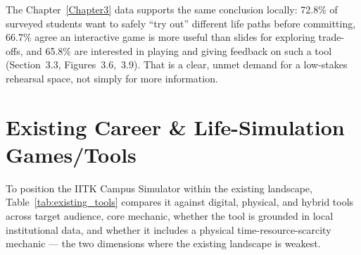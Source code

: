 The Chapter~\ref{Chapter3} data supports the same conclusion locally: 72.8\% of surveyed students want to safely ``try out'' different life paths before committing, 66.7\% agree an interactive game is more useful than slides for exploring trade-offs, and 65.8\% are interested in playing and giving feedback on such a tool (Section~3.3, Figures~3.6,~3.9). That is a clear, unmet demand for a low-stakes rehearsal space, not simply for more information.

\section{Existing Career \& Life-Simulation Games/Tools}

To position the IITK Campus Simulator within the existing landscape, Table~\ref{tab:existing_tools} compares it against digital, physical, and hybrid tools across target audience, core mechanic, whether the tool is grounded in local institutional data, and whether it includes a physical time-resource-scarcity mechanic --- the two dimensions where the existing landscape is weakest.

